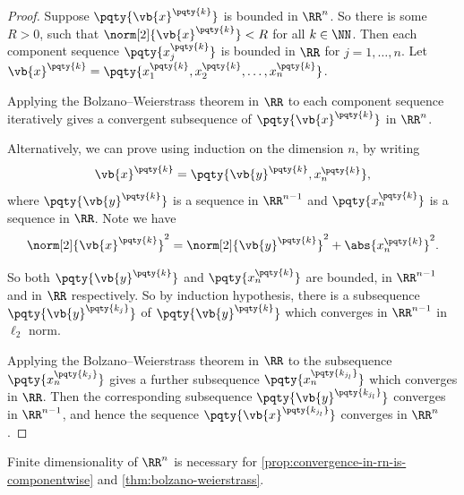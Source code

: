 \begin{proof}
    Suppose \(\pqty{\vb{x}^{\pqty{k}}}\) is bounded in \(\RR^n\). So there is some \(R > 0\), such that \(\norm[2]{\vb{x}^{\pqty{k}}} < R\) for all \(k \in \NN\). Then each component sequence \(\pqty{x_j^{\pqty{k}}}\) is bounded in \(\RR\) for \(j = 1, \dots, n\). Let \(\vb{x}^{\pqty{k}} = \pqty{x_1^{\pqty{k}}, x_2^{\pqty{k}}, \ldots, x_n^{\pqty{k}}}\).

    Applying the Bolzano--Weierstrass theorem in \(\RR\) to each component sequence iteratively gives a convergent subsequence of \(\pqty{\vb{x}^{\pqty{k}}}\) in \(\RR^n\).

    Alternatively, we can prove using induction on the dimension \(n\), by writing
    \[
        \vb{x}^{\pqty{k}} = \pqty{\vb{y}^{\pqty{k}}, x_n^{\pqty{k}}},
    \]
    where \(\pqty{\vb{y}^{\pqty{k}}}\) is a sequence in \(\RR^{n - 1}\) and \(\pqty{x_n^{\pqty{k}}}\) is a sequence in \(\RR\). Note we have
    \[
        \norm[2]{\vb{x}^{\pqty{k}}}^2 = \norm[2]{\vb{y}^{\pqty{k}}}^2 + \abs{x_n^{\pqty{k}}}^2.
    \]

    So both \(\pqty{\vb{y}^{\pqty{k}}}\) and \(\pqty{x_n^{\pqty{k}}}\) are bounded, in \(\RR^{n - 1}\) and in \(\RR\) respectively. So by induction hypothesis, there is a subsequence \(\pqty{\vb{y}^{\pqty{k_j}}}\) of \(\pqty{\vb{y}^{\pqty{k}}}\) which converges in \(\RR^{n - 1}\) in \(\ell_2\) norm.
    
    Applying the Bolzano--Weierstrass theorem in \(\RR\) to the subsequence \(\pqty{x_n^{\pqty{k_j}}}\) gives a further subsequence \(\pqty{x_n^{\pqty{k_{j_l}}}}\) which converges in \(\RR\). Then the corresponding subsequence \(\pqty{\vb{y}^{\pqty{k_{j_l}}}}\) converges in \(\RR^{n - 1}\), and hence the sequence \(\pqty{\vb{x}^{\pqty{k_{j_l}}}}\) converges in \(\RR^n\).
\end{proof}

\begin{remark}
    Finite dimensionality of \(\RR^n\) is necessary for \autoref{prop:convergence-in-rn-is-componentwise} and \autoref{thm:bolzano-weierstrass}.
\end{remark}


